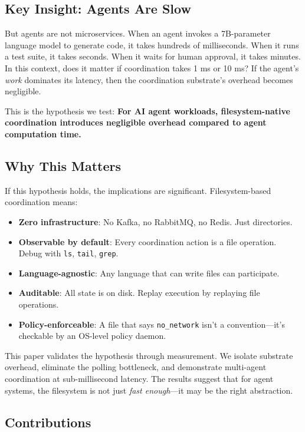 \documentclass[11pt]{article}
\begin{document}
\subsection{Key Insight: Agents Are Slow}

But agents are not microservices. When an agent invokes a 7B-parameter language model to generate code, it takes hundreds of milliseconds. When it runs a test suite, it takes seconds. When it waits for human approval, it takes minutes. In this context, does it matter if coordination takes 1 ms or 10 ms? If the agent's \emph{work} dominates its latency, then the coordination substrate's overhead becomes negligible.

This is the hypothesis we test: \textbf{For AI agent workloads, filesystem-native coordination introduces negligible overhead compared to agent computation time.}

\subsection{Why This Matters}

If this hypothesis holds, the implications are significant. Filesystem-based coordination means:
\begin{itemize}
\item \textbf{Zero infrastructure}: No Kafka, no RabbitMQ, no Redis. Just directories.
\item \textbf{Observable by default}: Every coordination action is a file operation. Debug with \texttt{ls}, \texttt{tail}, \texttt{grep}.
\item \textbf{Language-agnostic}: Any language that can write files can participate.
\item \textbf{Auditable}: All state is on disk. Replay execution by replaying file operations.
\item \textbf{Policy-enforceable}: A file that says \texttt{no\_network} isn't a convention---it's checkable by an OS-level policy daemon.
\end{itemize}

This paper validates the hypothesis through measurement. We isolate substrate overhead, eliminate the polling bottleneck, and demonstrate multi-agent coordination at sub-millisecond latency. The results suggest that for agent systems, the filesystem is not just \emph{fast enough}---it may be the right abstraction.

\subsection{Contributions}
\end{document}

